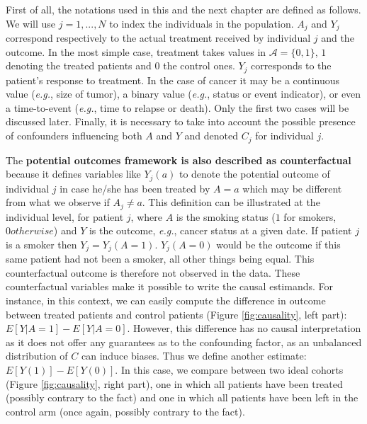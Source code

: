 \documentclass[a4paper,12pt,twoside,onecolumn,openright,final,oldfontcommands]{memoir}
\begin{document}
First of all, the notations used in this and the next chapter are
defined as follows. We will use \(j=1,...,N\) to index the individuals
in the population. \(A_j\) and \(Y_j\) correspond respectively to the
actual treatment received by individual \(j\) and the outcome. In the
most simple case, treatment takes values in \(\mathcal{A}=\{0, 1\}\),
\(1\) denoting the treated patients and \(0\) the control ones. \(Y_j\)
corresponds to the patient's response to treatment. In the case of
cancer it may be a continuous value (\emph{e.g.}, size of tumor), a
binary value (\emph{e.g.}, status or event indicator), or even a
time-to-event (\emph{e.g.}, time to relapse or death). Only the first
two cases will be discussed later. Finally, it is necessary to take into
account the possible presence of confounders influencing both \(A\) and
\(Y\) and denoted \(C_j\) for individual \(j\).

The \textbf{potential outcomes framework is also described as
counterfactual} because it defines variables like \(Y_j(a)\) to denote
the potential outcome of individual \(j\) in case he/she has been
treated by \(A=a\) which may be different from what we observe if
\(A_j\neq a\). This definition can be illustrated at the individual
level, for patient \(j\), where \(A\) is the smoking status (\(1\) for
smokers, \(0 otherwise\)) and \(Y\) is the outcome, \emph{e.g.}, cancer
status at a given date. If patient \(j\) is a smoker then
\(Y_j=Y_j(A=1)\). \(Y_j(A=0)\) would be the outcome if this same patient
had not been a smoker, all other things being equal. This counterfactual
outcome is therefore not observed in the data. These counterfactual
variables make it possible to write the causal estimands. For instance,
in this context, we can easily compute the difference in outcome between
treated patients and control patients (Figure \ref{fig:causality}, left
part): \(E[Y | A=1] - E[Y | A=0].\) However, this difference has no
causal interpretation as it does not offer any guarantees as to the
confounding factor, as an unbalanced distribution of \(C\) can induce
biases. Thus we define another estimate: \(E[Y(1)] - E[Y(0)].\) In this
case, we compare between two ideal cohorts (Figure \ref{fig:causality},
right part), one in which all patients have been treated (possibly
contrary to the fact) and one in which all patients have been left in
the control arm (once again, possibly contrary to the fact).
\end{document}
